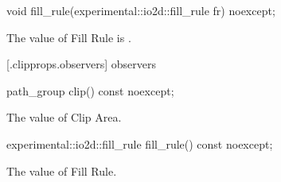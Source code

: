 \begin{itemdecl}
void fill_rule(experimental::io2d::fill_rule fr) noexcept;
\end{itemdecl}
\begin{itemdescr}
\pnum
\effects
The value of Fill Rule is .
\end{itemdescr}

 [\iotwod.clipprops.observers] { observers}

\begin{itemdecl}
path_group clip() const noexcept;
\end{itemdecl}
\begin{itemdescr}
\pnum
\returns
The value of Clip Area.
\end{itemdescr}

\begin{itemdecl}
experimental::io2d::fill_rule fill_rule() const noexcept;
\end{itemdecl}
\begin{itemdescr}
\pnum
\returns
The value of Fill Rule.
\end{itemdescr}
